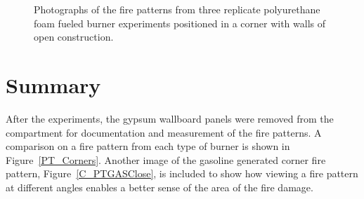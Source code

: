 \documentclass[twoside]{uocthesis}
\begin{document}
{\begin{figure}[p]
	\caption[Photographs of the fire patterns from three replicate polyurethane foam burner experiments positioned in a corner.]{Photographs of the fire patterns from three replicate polyurethane foam fueled burner experiments positioned in a corner with walls of open construction.}
	\label{PUF_Corner}
\end{figure}

\section{Summary}

After the experiments, the gypsum wallboard panels were removed from the compartment for documentation and measurement of the fire patterns.  A comparison on a fire pattern from each type of burner is shown in Figure~\ref{PT_Corners}.  Another image of the gasoline generated corner fire pattern, Figure~\ref{C_PTGASClose}, is included to show  how viewing a fire pattern at different angles enables a better sense of the area of the fire damage. 

}
\end{document}
